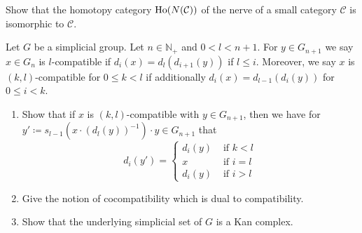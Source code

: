 \begin{Exercise}
    Show that the homotopy category $ \operatorname{Ho} ( N ( \mathcal{ C } ) ) $ of the nerve of a small category $ \mathcal{ C } $ is isomorphic to $ \mathcal{ C } $.
\end{Exercise}

\begin{Exercise}
    Let $ G $ be a simplicial group.
    Let $ n \in \mathbb{ N }_+ $ and $ 0 < l < n+1 $. 
    For $ y \in G_{n+1} $ we say $ x \in G_n $ is $l$-compatible if $ d_i ( x ) = d_l ( d_{i+1} ( y ) ) $ if $ l \leq i $. 
    Moreover, we say $x$ is $ ( k , l ) $-compatible for $ 0 \leq k < l $ if additionally $ d_i ( x ) = d_{ l-1 } ( d_i ( y ) ) $ for $ 0 \leq i < k $.
    
    \begin{enumerate}[label=(\alph*)]
        \item 
        Show that if $ x $ is $ ( k , l ) $-compatible with $ y \in G_{n+1} $, then we have for $ y' \coloneqq s_{l-1} ( x \cdot ( d_l ( y ))^{-1} ) \cdot y  \in G_{n+1} $ that 
        \[
        d_i ( y' ) =
        \begin{cases} 
            d_i(y) &\text{ if } k < l
            \\
            x &\text{ if } i = l 
            \\
            d_i ( y ) &\text{ if } i > l
        \end{cases}
        \]
    
        \item 
        Give the notion of cocompatibility which is dual to compatibility.
    
        \item 
        Show that the underlying simplicial set of $ G $ is a Kan complex.
        
    \end{enumerate}
\end{Exercise}

